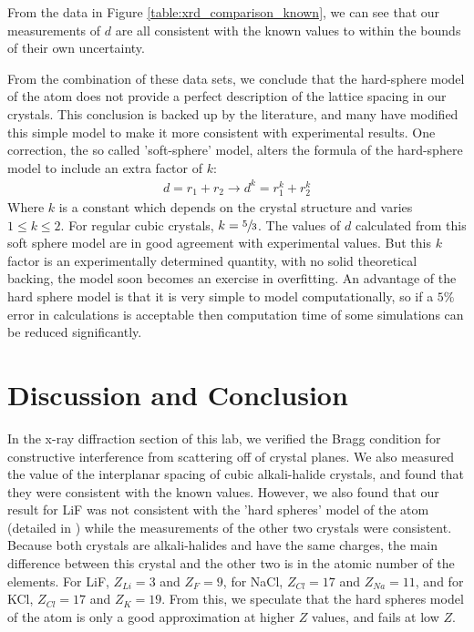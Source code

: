 \documentclass[%
 reprint,
 amsmath,amssymb,
 aps,
 pra,
]{revtex4-1}
\begin{document}
From the data in Figure \ref{table:xrd_comparison_known}, we can see that our measurements of $d$ are all consistent with the known values to within the bounds of their own uncertainty. 

From the combination of these data sets, we conclude that the hard-sphere model of the atom does not provide a perfect description of the lattice spacing in our crystals. This conclusion is backed up by the literature, and many have modified this simple model to make it more consistent with experimental results. One correction, the so called 'soft-sphere' model\cite{soft_sphere}, alters the formula of the hard-sphere model to include an extra factor of $k$:
\begin{gather}
	d = r_1 + r_2 \rightarrow d^k = r_1^k + r_2^k \nonumber
\end{gather}
Where $k$ is a constant which depends on the crystal structure and varies $1 \le k \le 2$. For regular cubic crystals, $k = \sfrac{5}{3}$. The values of $d$ calculated from this soft sphere model are in good agreement with experimental values. But this $k$ factor is an experimentally determined quantity, with no solid theoretical backing, the model soon becomes an exercise in overfitting. An advantage of the hard sphere model is that it is very simple to model computationally, so if a $5\%$ error in calculations is acceptable then computation time of some simulations can be reduced significantly. 

\section{Discussion and Conclusion}

In the x-ray diffraction section of this lab, we verified the Bragg condition for constructive interference from scattering off of crystal planes. We also measured the value of the interplanar spacing of cubic alkali-halide crystals, and found that they were consistent with the known values. However, we also found that our result for LiF was not consistent with the 'hard spheres' model of the atom (detailed in \cite{hard_sphere, hard_sphere2}) while the measurements of the other two crystals were consistent. Because both crystals are alkali-halides and have the same charges, the main difference between this crystal and the other two is in the atomic number of the elements. For LiF, $Z_{Li} = 3$ and $Z_{F} = 9$, for NaCl, $Z_{Cl} = 17$ and $Z_{Na} = 11$, and for KCl, $Z_{Cl} = 17$ and $Z_{K} = 19$. From this, we speculate that the hard spheres model of the atom is only a good approximation at higher $Z$ values, and fails at low $Z$.
\end{document}
